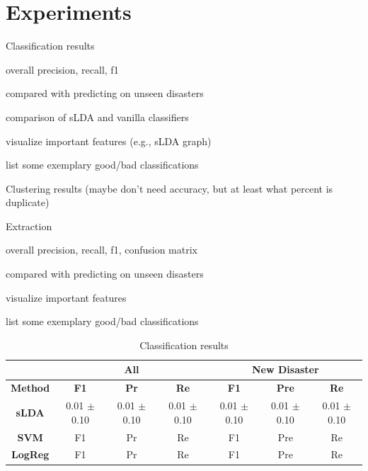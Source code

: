 \documentclass{article}
\begin{document}
\section{Experiments}
\begin{outline}
  \item Classification results
    \begin{outline}
      \item overall precision, recall, f1
      \item compared with predicting on unseen disasters
      \item comparison of sLDA and vanilla classifiers
      \item visualize important features (e.g., sLDA graph)
      \item list some exemplary good/bad classifications
    \end{outline}
  \item Clustering results (maybe don't need accuracy, but at least what percent is duplicate)
  \item Extraction
    \begin{outline}
      \item overall precision, recall, f1, confusion matrix
      \item compared with predicting on unseen disasters
      \item visualize important features
      \item list some exemplary good/bad classifications
    \end{outline}
\end{outline}

\begin{table}[t]
\centering
\begin{tabular}{|c|c|c|c|c|c|c|}
\hline
              & \multicolumn{3}{c|}{All} &                       \multicolumn{3}{c|}{New Disaster}  \\
\hline
{\bf Method}  &  {\bf F1}        &  {\bf Pr}  &  {\bf Re} & {\bf F1}  &  {\bf Pre}  &  {\bf Re}\\
\hline
{\bf sLDA}    &  0.01 $\pm$ 0.10 & 0.01 $\pm$ 0.10 & 0.01 $\pm$ 0.10 & 0.01 $\pm$ 0.10 & 0.01 $\pm$ 0.10 & 0.01 $\pm$ 0.10\\
{\bf SVM}     &       F1         &       Pr        &       Re        &      F1         &       Pre       &       Re \\
{\bf LogReg}  &       F1         &       Pr        &       Re        &      F1         &       Pre       &       Re \\
\hline
\end{tabular}
\caption{Classification results\label{tab.classification_results}}
\end{table}
\end{document}
